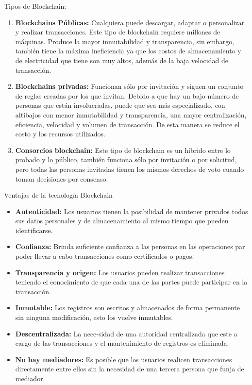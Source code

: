 \documentclass{article}
\begin{document}
    Tipos de Blockchain:
    \begin{enumerate}
        \item \textbf{Blockchains Públicas:} Cualquiera puede descargar, adaptar o personalizar y realizar transacciones. Este tipo de blockchain requiere millones de máquinas. Produce la mayor inmutabilidad y transparencia, sin embargo, también tiene la máxima ineficiencia ya que los costos de almacenamiento y de electricidad que tiene son muy altos, además de la baja velocidad de transacción.
        \item \textbf{Blockchains privadas:} Funcionan sólo por invitación y siguen un conjunto de reglas creadas por los que invitan. Debido a que hay un bajo número de personas que están involucradas, puede que sea más especializado, con altibajos con menor inmutabilidad y transparencia, una mayor centralización, eficiencia, velocidad y volumen de transacción. De esta manera se reduce el costo y los recursos utilizados.
        \item \textbf{Consorcios blockchain:} Este tipo de blockchain es un híbrido entre lo probado y lo público, también funciona sólo por invitación o por solicitud, pero todas las personas invitadas tienen los mismos derechos de voto cuando toman decisiones por consenso.
    \end{enumerate}

    Ventajas de la tecnología Blockchain
    \begin{itemize}
        \item \textbf{Autenticidad:} Los usuarios tienen la posibilidad de mantener privados todos sus datos personales y de almacenamiento al mismo tiempo que pueden identificarse.
        \item \textbf{Confianza:} Brinda suficiente confianza a las personas en las operaciones par poder llevar a cabo transacciones como certificados o pagos.
        \item \textbf{Transparencia y origen:} Los usuarios pueden realizar transacciones teniendo el conocimiento de que cada una de las partes puede participar en la transacción.
        \item \textbf{Inmutable:} Los registros son escritos y almacenados de forma permanente sin ninguna modificación, esto los vuelve inmutables.
        \item \textbf{Descentralizada:} La nece-sidad de una autoridad centralizada que este a cargo de las transacciones y el mantenimiento de registros es eliminada.
        \item \textbf{No hay mediadores:} Es posible que los usuarios realicen transacciones directamente entre ellos sin la necesidad de una tercera persona que funja de mediador.
    \end{itemize}
        \clearpage
        
        
\end{document}
